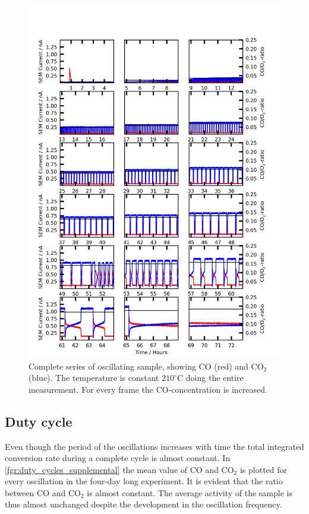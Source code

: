\documentclass[journal=jacsat,manuscript=article]{achemso}
\begin{document}
\begin{figure}
  \includegraphics[width=14cm]{oscillations_gas_dependence_supplemental.png}
  \caption{Complete series of oscillating sample, showing CO (red) and CO$_2$
  (blue). The temperature is constant $210^\circ$C doing the entire
  measurement. For every frame the CO-concentration is increased.}
  \label{fgr:gas_dependence}
\end{figure}

\subsection{Duty cycle}
Even though the period of the oscillations increases with time the total
integrated conversion rate during a complete cycle is almost constant. In
\ref{fgr:duty_cycles_supplemental} the mean value of CO and
CO$_2$ is plotted for every oscillation in the four-day long experiment. It is
evident that the ratio between CO and CO$_2$ is almost constant. The
average activity of the sample is thus almost unchanged despite the development in
the oscillation frequency.
\end{document}
